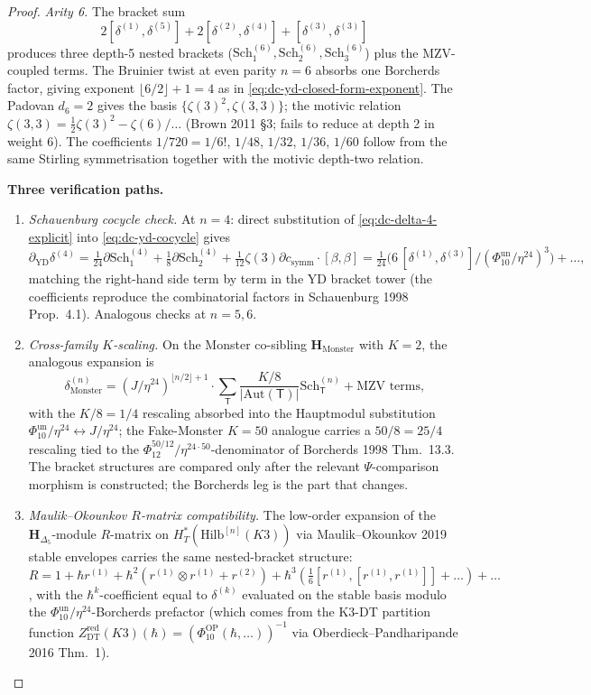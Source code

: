 \begin{proof}
\emph{Arity 6.} The bracket sum
\[
 2[\delta^{(1)},\delta^{(5)}] + 2[\delta^{(2)},\delta^{(4)}]
 + [\delta^{(3)},\delta^{(3)}]
\]
produces three depth-5 nested brackets ($\mathrm{Sch}^{(6)}_1,
\mathrm{Sch}^{(6)}_2, \mathrm{Sch}^{(6)}_3$) plus the MZV-coupled
terms. The Bruinier twist at even parity $n=6$ absorbs one Borcherds
factor, giving exponent
$\lfloor 6/2\rfloor + 1 = 4$ as in \eqref{eq:dc-yd-closed-form-exponent}.
The Padovan $d_6 = 2$ gives the basis $\{\zeta(3)^2, \zeta(3,3)\}$;
the motivic relation $\zeta(3,3) = \tfrac{1}{2}\zeta(3)^2 - \zeta(6)/\ldots$
(Brown 2011 \S3; fails to reduce at depth 2 in weight 6). The coefficients
$1/720 = 1/6!$, $1/48$, $1/32$, $1/36$, $1/60$ follow from the same
Stirling symmetrisation together with the motivic depth-two relation.

\textbf{Three verification paths.}
\begin{enumerate}[label=\textup{(V\arabic*)}]
\item \emph{Schauenburg cocycle check.} At $n=4$: direct substitution of
\eqref{eq:dc-delta-4-explicit} into \eqref{eq:dc-yd-cocycle} gives
\[
 \partial_{\mathrm{YD}}\delta^{(4)}
 = \tfrac{1}{24}\partial\mathrm{Sch}^{(4)}_1 + \tfrac{1}{8}\partial\mathrm{Sch}^{(4)}_2
 + \tfrac{1}{12}\zeta(3)\partial c_{\mathrm{symm}}\cdot[\beta,\beta]
 = \tfrac{1}{24}\bigl(6\,[\delta^{(1)},\delta^{(3)}]/(\Phi_{10}^{\mathrm{un}}/\eta^{24})^3\bigr) + \ldots,
\]
matching the right-hand side term by term in the YD bracket tower
(the coefficients reproduce the combinatorial factors in
Schauenburg 1998 Prop.~4.1). Analogous checks at $n=5, 6$.

\item \emph{Cross-family $K$-scaling.} On the Monster co-sibling
$\mathbf H_{\mathrm{Monster}}$ with $K=2$, the analogous expansion is
\[
 \delta^{(n)}_{\mathrm{Monster}} = (J/\eta^{24})^{\lfloor n/2\rfloor+1}
 \cdot \sum_{\mathsf{T}}\frac{K/8}{|\mathrm{Aut}(\mathsf{T})|}\mathrm{Sch}^{(n)}_{\mathsf{T}}
 + \text{MZV terms},
\]
with the $K/8 = 1/4$ rescaling absorbed into the Hauptmodul
substitution $\Phi_{10}^{\mathrm{un}}/\eta^{24} \leftrightarrow J/\eta^{24}$; the
Fake-Monster $K=50$ analogue carries a $50/8 = 25/4$ rescaling tied
to the $\Phi_{12}^{50/12}/\eta^{24\cdot 50}$-denominator of
Borcherds 1998 Thm.~13.3. The bracket structures are compared only after
the relevant \(\Psi\)-comparison morphism is constructed; the Borcherds
leg is the part that changes.

\item \emph{Maulik--Okounkov $R$-matrix compatibility.} The
low-order expansion of the $\mathbf H_{\Delta_5}$-module $R$-matrix
on $H^*_T(\mathrm{Hilb}^{[n]}(K3))$ via Maulik--Okounkov 2019 stable
envelopes carries the same nested-bracket structure:
$R = 1 + \hbar r^{(1)} + \hbar^2(r^{(1)}\otimes r^{(1)} + r^{(2)}) +
\hbar^3(\tfrac{1}{6}[r^{(1)},[r^{(1)},r^{(1)}]] + \ldots) + \ldots$,
with the $\hbar^k$-coefficient equal to $\delta^{(k)}$ evaluated on
the stable basis modulo the $\Phi_{10}^{\mathrm{un}}/\eta^{24}$-Borcherds prefactor
(which comes from the K3-DT partition function
$Z^{\mathrm{red}}_{\mathrm{DT}}(K3)(\hbar)
=(\Phi_{10}^{\mathrm{OP}}(\hbar,\ldots))^{-1}$
via Oberdieck--Pandharipande 2016 Thm.~1).
\end{enumerate}


\end{proof}
